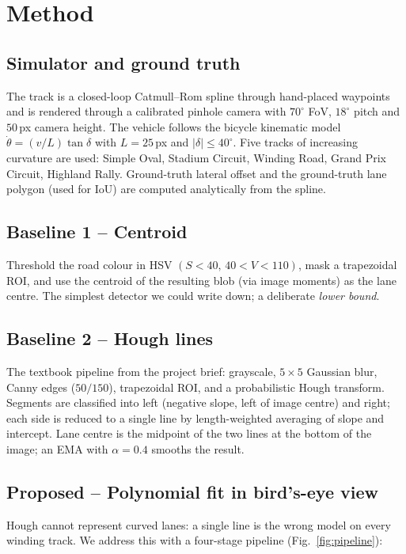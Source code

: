 \documentclass[10pt,a4paper,twocolumn]{article}
\begin{document}
\section{Method}

\subsection{Simulator and ground truth}
The track is a closed-loop Catmull--Rom spline through hand-placed
waypoints and is rendered through a calibrated pinhole camera with
$70^{\circ}$ FoV, $18^{\circ}$ pitch and $50$\,px camera height. The
vehicle follows the bicycle kinematic model
$\dot{\theta}=(v/L)\tan\delta$ with $L=25$\,px and
$|\delta|\!\leq\!40^\circ$. Five tracks of increasing curvature are
used: Simple Oval, Stadium Circuit, Winding Road, Grand Prix Circuit,
Highland Rally. Ground-truth lateral offset and the ground-truth lane
polygon (used for IoU) are computed analytically from the spline.

\subsection{Baseline 1 -- Centroid}
Threshold the road colour in HSV $(S\!<\!40,\,40\!<\!V\!<\!110)$, mask
a trapezoidal ROI, and use the centroid of the resulting blob (via
image moments) as the lane centre. The simplest detector we could
write down; a deliberate \emph{lower bound}.

\subsection{Baseline 2 -- Hough lines}
The textbook pipeline from the project brief: grayscale,
$5{\times}5$ Gaussian blur, Canny edges ($50/150$), trapezoidal ROI,
and a probabilistic Hough transform. Segments are classified into left
(negative slope, left of image centre) and right; each side is reduced
to a single line by length-weighted averaging of slope and intercept.
Lane centre is the midpoint of the two lines at the bottom of the
image; an EMA with $\alpha=0.4$ smooths the result.

\subsection{Proposed -- Polynomial fit in bird's-eye view}
Hough cannot represent curved lanes: a single line is the wrong model
on every winding track. We address this with a four-stage pipeline
(Fig.~\ref{fig:pipeline}):
\end{document}
